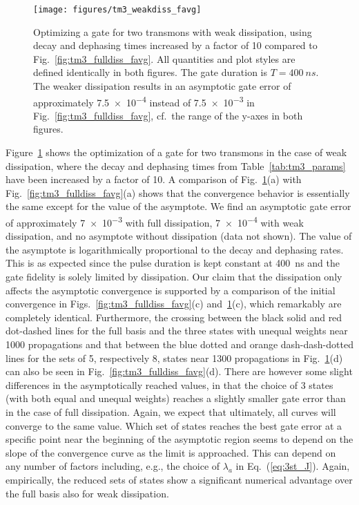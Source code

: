 \begin{figure}[tb] %
  \centering
 \texttt{[image: figures/tm3\_weakdiss\_favg]}
 \caption{Optimizing a \sqrtISWAP{} gate for two transmons with weak
   dissipation, using decay and dephasing times increased by a factor of 10
   compared to Fig.~\ref{fig:tm3_fulldiss_favg}. All quantities and
   plot styles are defined identically in both figures. The gate duration
   is $T=\SI{400}{ns}$.  The weaker dissipation results in an asymptotic gate error of
   approximately \num{7.5e-4} instead of \num{7.5e-3} in
   Fig.~\ref{fig:tm3_fulldiss_favg}, cf.\ the range of the y-axes in
   both figures.
   }
 \label{fig:tm3_weakdiss_favg}
\end{figure}
Figure~\ref{fig:tm3_weakdiss_favg} shows the optimization of
a \sqrtISWAP{} gate for two transmons in the
case of weak dissipation, where the decay and dephasing times from
Table~\ref{tab:tm3_params} have been increased by a factor of 10. A comparison of
Fig.~\ref{fig:tm3_weakdiss_favg}(a) with
Fig.~\ref{fig:tm3_fulldiss_favg}(a) shows that the
convergence
behavior is essentially the same except for the value of the asymptote. We find
an asymptotic gate error of approximately \num{7e-3} with full
dissipation, \num{7e-4} with weak dissipation, and no asymptote without
dissipation (data not shown). The value of the asymptote is logarithmically
proportional to the decay and dephasing rates. This is as expected
since the pulse duration is kept constant at \SI{400}{ns} and the gate
fidelity is solely limited by
dissipation. Our claim that the dissipation only affects the asymptotic
convergence is supported by a comparison of the initial convergence
in Figs.~\ref{fig:tm3_fulldiss_favg}(c)
and~\ref{fig:tm3_weakdiss_favg}(c),
which remarkably are completely identical.
Furthermore, the crossing between the black solid and red dot-dashed lines for
the full basis and the three states with unequal weights near 1000 propagations
and that between the blue dotted and orange dash-dash-dotted lines for the sets
of 5, respectively 8, states near
1300 propagations in Fig.~\ref{fig:tm3_weakdiss_favg}(d) can
also be seen in Fig.~\ref{fig:tm3_fulldiss_favg}(d).
There are however some slight differences in the asymptotically reached values,
in that the choice of 3 states (with both equal and unequal weights) reaches a slightly
smaller gate error than in the case of full dissipation. Again, we expect that
ultimately, all curves will converge to the same value. Which set of states
reaches the best gate error at a specific point near the beginning of the
asymptotic region seems to depend on the slope of the convergence curve as the
limit is approached. This can depend on any number of factors
including, e.g., the choice
of $\lambda_a$ in Eq.~(\ref{eq:3st_J}). Again, empirically, the reduced sets of
states show a significant numerical advantage over the full basis also
for weak dissipation.

